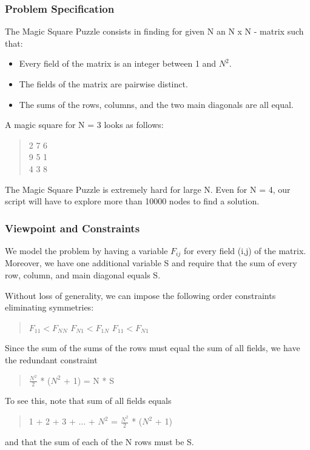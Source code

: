 \documentclass[a4paper,halfparskip]{scrartcl}
\begin{document}
\subsubsection{Problem Specification}
The Magic Square Puzzle consists in finding for given N
an N x N  - matrix such that:
\begin{itemize} 
\item
Every field of the matrix is an integer between 1 and $N^2$.
\item
The fields of the matrix are pairwise distinct.
\item
The sums of the rows, columns, and the two main diagonals
 are all equal.
\end{itemize}
A magic square for N = 3 looks as follows:
\begin{quote}
2 \hspace{4mm} 7 \hspace{4mm}6\\
9 \hspace{4mm} 5 \hspace{4mm}1\\
4 \hspace{4mm} 3 \hspace{4mm}8
\end{quote}
The Magic Square Puzzle is extremely hard for large N. 
Even for N = 4, our script will have to explore more 
than 10000 
nodes to find a solution. 

\subsubsection{Viewpoint and Constraints}
We model the problem by having a variable $F_{ij}$ for every field 
(i,j) of the matrix. Moreover, we have one additional variable S 
and require that the sum of every row, column, and main diagonal 
equals S.

Without loss of generality, we can impose the following order 
constraints eliminating symmetries: 
\begin{quote}
$F_{11} < F_{NN}$ \hspace{4mm}$F_{N1} < F_{1N}$ \hspace{4mm}$F_{11} < F_{N1}$
\end{quote}
Since the sum of the sums of the rows must equal the sum of all 
fields, we have the redundant constraint
\begin{quote}
$\frac{N^2}{2}$ * ($N^2$ + 1) = N * S
\end{quote} 
To see this, note that sum of all fields equals 
\begin{quote}
1 + 2 + 3 + $\ldots$ + $N^2$ = $\frac{N^2}{2}$ * ($N^2$ + 1)
\end{quote}
and that the sum of each of the N rows must be S. 
\end{document}
